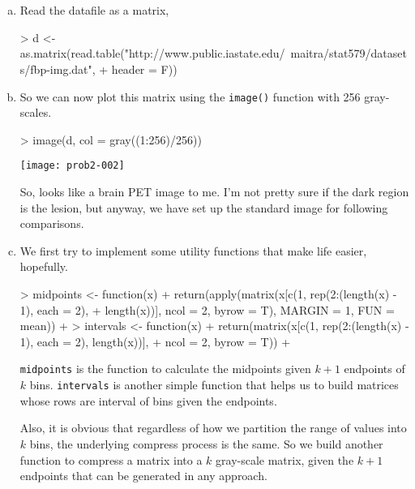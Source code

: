 
\section{}
\begin{enumerate}[(a)]
    \item
    Read the datafile as a matrix,
\begin{Schunk}
\begin{Sinput}
> d <- as.matrix(read.table("http://www.public.iastate.edu/~maitra/stat579/datasets/fbp-img.dat", 
+     header = F))
\end{Sinput}
\end{Schunk}
    \item So we can now plot this matrix using the \verb=image()= function with 256 gray-scales.
\begin{Schunk}
\begin{Sinput}
> image(d, col = gray((1:256)/256))
\end{Sinput}
\end{Schunk}
\texttt{[image: prob2-002]}

    So, looks like a brain PET image to me. I'm not pretty sure if the dark region is the lesion, but anyway, we have set up the standard image for following comparisons.
    \item
    We first try to implement some utility functions that make life easier, hopefully.
\begin{Schunk}
\begin{Sinput}
> midpoints <- function(x) {
+     return(apply(matrix(x[c(1, rep(2:(length(x) - 1), each = 2), 
+         length(x))], ncol = 2, byrow = T), MARGIN = 1, FUN = mean))
+ }
> intervals <- function(x) {
+     return(matrix(x[c(1, rep(2:(length(x) - 1), each = 2), length(x))], 
+         ncol = 2, byrow = T))
+ }
\end{Sinput}
\end{Schunk}
    \verb=midpoints= is the function to calculate the midpoints given $k+1$ endpoints of $k$ bins. \verb=intervals= is another simple function that helps us to build matrices whose rows are interval of bins given the endpoints. 

    Also, it is obvious that regardless of how we partition the range of values into $k$ bins, the underlying compress process is the same. So we build another function to compress a matrix into a $k$ gray-scale matrix, given the $k+1$ endpoints that can be generated in any approach.


\end{enumerate}
